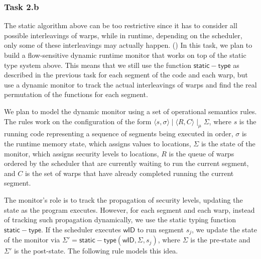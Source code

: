 \subsubsection{Task 2.b} 
The static algorithm above can be too restrictive since it has to consider all possible interleavings of warps, while in runtime, depending on the scheduler, only some of these interleavings may actually happen. 
%
()
In this task, we plan to build a flow-sensitive dynamic runtime monitor
that works on top of the static type system above.
%
This means that we still use the function $\mathsf{static-type}$ as described in the previous task for each segment of the code and  each warp, but use a dynamic monitor to track the actual interleavings of warps and find the real permutation of the functions for each segment.

We plan to model the dynamic monitor using a set of operational semantics rules.
%
The rules work on the configuration of the form $\langle s, \sigma \rangle \mid \langle R,C \rangle  \mid_\mu  \Sigma$, where $s$ is the running code representing a sequence of segments being executed in order, $\sigma$ is the runtime memory state, which assigns values to locations,  $\Sigma $ is the state of the monitor, which  assigns security levels to locations, $R$ is the queue of warps ordered by the scheduler that are currently waiting to run the current segment, and $C$ is the set of warps that have already completed running the current segment.
%

The monitor's role is to track the propagation of security levels, updating the state as the program executes.
%
However, for each segment and each warp, instead of tracking such propagation dynamically, we use the static typing function $\mathsf{static-type}$.
%
If the scheduler executes $\mathsf{wID}$ to run segment $s_j$, we update the state of the monitor via $\Sigma'=\mathsf{static-type}(\mathsf{wID}, \Sigma, s_j)$, where $\Sigma$ is the pre-state and $\Sigma'$ is the post-state.
The following rule models this idea.


\begin{mathpar}
\end{mathpar}

